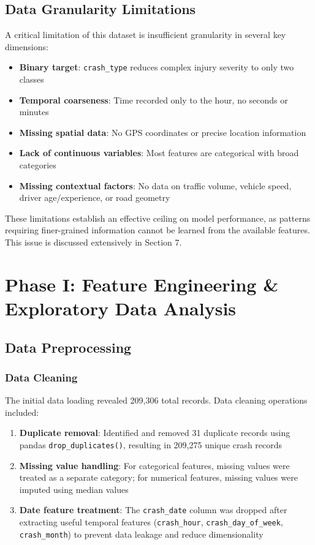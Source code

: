 \documentclass[12pt,man]{apa7}
\begin{document}
\subsection{Data Granularity Limitations}

A critical limitation of this dataset is insufficient granularity in several key dimensions:

\begin{itemize}
    \item \textbf{Binary target}: \texttt{crash\_type} reduces complex injury severity to only two classes
    \item \textbf{Temporal coarseness}: Time recorded only to the hour, no seconds or minutes
    \item \textbf{Missing spatial data}: No GPS coordinates or precise location information
    \item \textbf{Lack of continuous variables}: Most features are categorical with broad categories
    \item \textbf{Missing contextual factors}: No data on traffic volume, vehicle speed, driver age/experience, or road geometry
\end{itemize}

These limitations establish an effective ceiling on model performance, as patterns requiring finer-grained information cannot be learned from the available features. This issue is discussed extensively in Section 7.

\section{Phase I: Feature Engineering \& Exploratory Data Analysis}

\subsection{Data Preprocessing}

\subsubsection{Data Cleaning}

The initial data loading revealed 209,306 total records. Data cleaning operations included:

\begin{enumerate}
    \item \textbf{Duplicate removal}: Identified and removed 31 duplicate records using pandas \texttt{drop\_duplicates()}, resulting in 209,275 unique crash records
    \item \textbf{Missing value handling}: For categorical features, missing values were treated as a separate category; for numerical features, missing values were imputed using median values
    \item \textbf{Date feature treatment}: The \texttt{crash\_date} column was dropped after extracting useful temporal features (\texttt{crash\_hour}, \texttt{crash\_day\_of\_week}, \texttt{crash\_month}) to prevent data leakage and reduce dimensionality
\end{enumerate}
\end{document}
